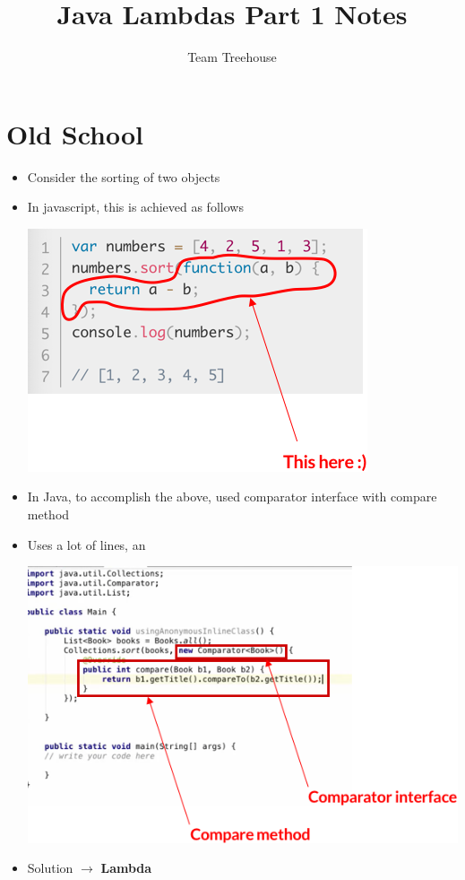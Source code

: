 \documentclass[12pt]{article}
\begin{document}
\title{Java Lambdas Part 1 Notes}
\author{Team Treehouse}
\maketitle

\bigskip

\section{Old School}

\bigskip

\begin{itemize}
    \item Consider the sorting of two objects
    \item In javascript, this is achieved as follows

    \begin{center}
    \includegraphics[width=0.8\linewidth]{images/part_1_notes_1.png}
    \end{center}

    \item In Java, to accomplish the above, used comparator interface with compare method
    \item Uses a lot of lines, an
    \begin{center}
    \includegraphics[width=0.8\linewidth]{images/part_1_notes_2.png}
    \end{center}
    \item Solution $\to$ \textbf{Lambda}
\end{itemize}
\end{document}
